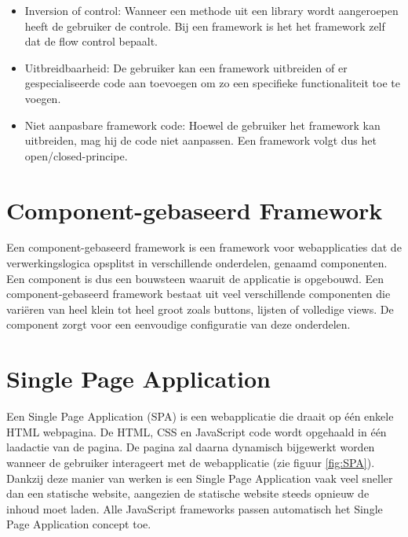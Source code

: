 \begin{itemize}
	\item Inversion of control: Wanneer een methode uit een library wordt aangeroepen heeft de gebruiker de controle. Bij een framework is het het framework zelf dat de flow control bepaalt. 
	\item Uitbreidbaarheid: De gebruiker kan een framework uitbreiden of er gespecialiseerde code aan toevoegen om zo een specifieke functionaliteit toe te voegen. 
	\item Niet aanpasbare framework code: Hoewel de gebruiker het framework kan uitbreiden, mag hij de code niet aanpassen. Een framework volgt dus het open/closed-principe. 
	
\end{itemize}


\section{Component-gebaseerd Framework}
Een component-gebaseerd framework is een framework voor webapplicaties dat de verwerkingslogica opsplitst in verschillende onderdelen, genaamd componenten. 
Een component is dus een bouwsteen waaruit de applicatie is opgebouwd. Een component-gebaseerd framework bestaat uit veel verschillende componenten die variëren van heel klein tot heel groot zoals buttons, lijsten of volledige views. De component zorgt voor een eenvoudige configuratie van deze onderdelen. 


\section{Single Page Application}
Een Single Page Application (SPA) is een webapplicatie die draait op één enkele HTML webpagina. De HTML, CSS en JavaScript code wordt opgehaald in één laadactie van de pagina. De pagina zal daarna dynamisch bijgewerkt worden wanneer de gebruiker interageert met de webapplicatie (zie figuur \ref{fig:SPA}). Dankzij deze manier van werken is een Single Page Application vaak veel sneller dan een statische website, aangezien de statische website steeds opnieuw de inhoud moet laden. Alle JavaScript frameworks passen automatisch het Single Page Application concept toe. 

